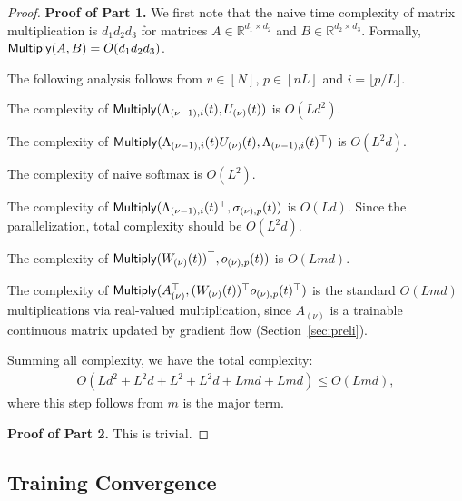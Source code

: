 \documentclass[11pt]{article}
\theoremstyle{plain}
\newcommand{\R}{\mathbb{R}}
\begin{document}
\begin{proof}
    {\bf Proof of Part 1.} We first note that the naive time complexity of matrix multiplication is $d_1d_2d_3$ for matrices $A \in \R^{d_1 \times d_2}$ and $B \in \R^{d_2 \times d_3}$. Formally, ${\sf Multiply}(A, B) = O(d_1d_2d_3)$.

    The following analysis follows from $v \in [N]$, $p \in [nL]$ and $i = \lfloor p / L \rfloor$.

    The complexity of ${\sf Multiply}(\Lambda_{(\nu-1), i}(t), U_{(\nu)}(t))$ is $O(Ld^2)$.

    The complexity of ${\sf Multiply}(\Lambda_{(\nu-1), i}(t) U_{(\nu)}(t), \Lambda_{(\nu-1), i}(t)^\top)$ is $O(L^2d)$.

    The complexity of naive softmax is $O(L^2)$.

    The complexity of ${\sf Multiply}(\Lambda_{(\nu-1), i}(t)^\top, \sigma_{(\nu), p}(t))$ is $O(Ld)$. Since the parallelization, total complexity should be $O(L^2d)$.

    The complexity of ${\sf Multiply}(  W_{(\nu)}(t))^\top , o_{(\nu), p}(t))$ is $O(Lmd)$.

    The complexity of ${\sf Multiply}(A_{(\nu)}^\top,(W_{(\nu)}(t))^\top o_{(\nu),p}(t)^\top)$ is the standard $O(Lmd)$ multiplications via real-valued multiplication, since $A_{(\nu)}$ is a trainable continuous matrix updated by gradient flow (Section~\ref{sec:preli}).

    Summing all complexity, we have the total complexity:
    \begin{align*}
        O(Ld^2 + L^2d+L^2+L^2d+Lmd+Lmd) \leq O(Lmd),
    \end{align*}
    where this step follows from $m$ is the major term.

    {\bf Proof of Part 2.}
    This is trivial.
\end{proof}

\subsection{Training Convergence}\label{app_sub:convergence}
\end{document}
